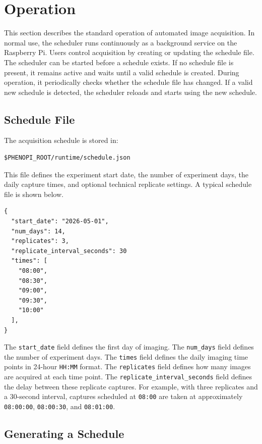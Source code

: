 \section{Operation}

This section describes the standard operation of automated image acquisition.
In normal use, the scheduler runs continuously as a background service on the
Raspberry Pi. Users control acquisition by creating or updating the schedule
file. The scheduler can be started before a schedule exists. If no schedule
file is present, it remains active and waits until a valid schedule is created.
During operation, it periodically checks whether the schedule file has changed.
If a valid new schedule is detected, the scheduler reloads and starts using the
new schedule.

\subsection{Schedule File}

The acquisition schedule is stored in:

\begin{verbatim}
$PHENOPI_ROOT/runtime/schedule.json
\end{verbatim}

This file defines the experiment start date, the number of experiment days, the
daily capture times, and optional technical replicate settings. A typical
schedule file is shown below.

\begin{verbatim}
{
  "start_date": "2026-05-01",
  "num_days": 14,
  "replicates": 3,
  "replicate_interval_seconds": 30
  "times": [
    "08:00",
    "08:30",
    "09:00",
    "09:30",
    "10:00"
  ],
}
\end{verbatim}

The \texttt{start\_date} field defines the first day of imaging. The
\texttt{num\_days} field defines the number of experiment days. The
\texttt{times} field defines the daily imaging time points in 24-hour
\texttt{HH:MM} format. The \texttt{replicates} field defines how many images
are acquired at each time point. The \texttt{replicate\_interval\_seconds}
field defines the delay between these replicate captures. For example, with
three replicates and a 30-second interval, captures scheduled at \texttt{08:00}
are taken at approximately \texttt{08:00:00}, \texttt{08:00:30}, and
\texttt{08:01:00}.

\subsection{Generating a Schedule}

